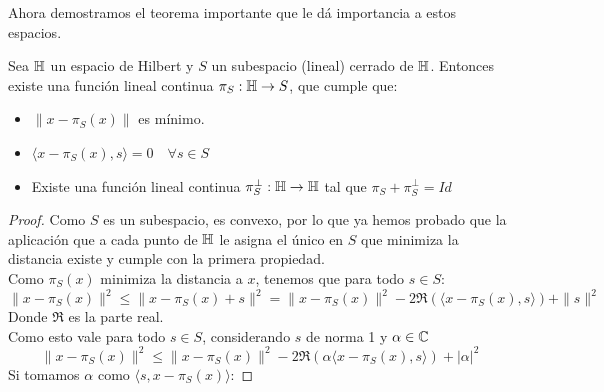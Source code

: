 \documentclass[12pt,a4paper]{book}
\begin{document}
Ahora demostramos el teorema importante que le dá importancia a estos espacios.
\begin{teo}
Sea $\mathbb{H}$ un espacio de Hilbert y $S$ un subespacio (lineal) cerrado de $\mathbb{H}$. Entonces existe una función lineal continua
$\pi_S: \mathbb{H} \rightarrow S$, que cumple que:
\begin{itemize}
\item $\| x - \pi_S(x)\|$ es mínimo.
\item $ \langle x - \pi_S(x) , s \rangle = 0 \quad \forall s \in S$
\item Existe una función lineal continua $\pi^{\perp}_S: \mathbb{H} \rightarrow \mathbb{H}$ tal que $\pi_S + \pi^{\perp}_S = Id$
\end{itemize}
\begin{proof}
Como $S$ es un subespacio, es convexo, por lo que ya hemos probado que la aplicación que a cada punto de $\mathbb{H}$ le asigna el único en $S$ que minimiza la distancia existe y cumple con la primera propiedad.\\
Como $\pi_S(x)$ minimiza la distancia a $x$, tenemos que para todo $s \in S$:
$$\| x - \pi_S(x) \|^2 \leq \| x - \pi_S(x) + s \|^2 = \|x- \pi_S(x) \|^2 - 2 \Re(\langle x - \pi_S(x),s \rangle) + \|s\|^2 $$
Donde $\Re$ es la parte real.\\
Como esto vale para todo $s \in S$, considerando $s$ de norma 1 y $\alpha \in \mathbb{C}$
$$\| x - \pi_S(x) \|^2 \leq \|x- \pi_S(x) \|^2 - 2 \Re(\alpha \langle x - \pi_S(x),s \rangle) + |\alpha|^2$$
Si tomamos $\alpha$ como $\langle s , x - \pi_S(x) \rangle$:


\end{proof}
\end{teo}
\end{document}
